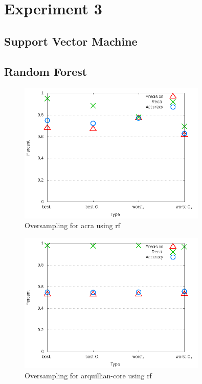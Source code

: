 \section{Experiment 3}
\label{app_sec:experiment_3}

\subsection{Support Vector Machine}
\label{app_sub:experiment_3_svm}
\clearpage


\subsection{Random Forest}
\label{app_sub:experiment_3_rf}
\clearpage

\begin{figure}
\centering
\includegraphics[width=0.8\textwidth]{images/rf/test_4/acra_sample_range.png}
\caption{Oversampling for acra using \gls{rf}}
\label{fig:test_4_acra_rf}
\end{figure}

\begin{figure}
\centering
\includegraphics[width=0.8\textwidth]{images/rf/test_4/arquillian-core_sample_range.png}
\caption{Oversampling for arquillian-core using \gls{rf}}
\label{fig:test_4_arquillian-core_rf}
\end{figure}
\clearpage

